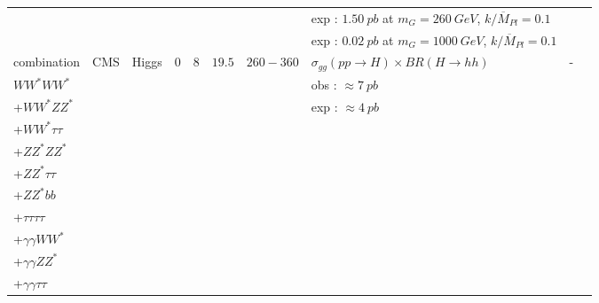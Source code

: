 \begin{table}[h!]
{\begin{tabular}{|l|l|c|c|c|c|c|l|c|c|}
                    &        &                &    &        &        &            &exp : $1.50\ pb$ at $m_G=260\ GeV$, $k/\overline{M}_{Pl}=0.1$                &    &\\
                    &        &                &    &        &        &            &exp : $0.02\ pb$ at $m_G=1000\ GeV$, $k/\overline{M}_{Pl}=0.1$                &    &\\
\cline{1-10}
combination                &CMS        &Higgs                &0    &$8$        &$19.5$        &$260-360$        &$\sigma_{gg}(pp\rightarrow H)\times BR(H\rightarrow hh)$                 &-    &\cite{Khachatryan:2014jya}\\
$WW^* WW^*$                &        &                &    &        &        &            &obs : $\approx 7\ pb$    & &\\
+$WW^*ZZ^*$                &        &                &    &        &        &            &exp : $\approx 4\ pb$    & &\\
+$WW^*\tau\tau$                &        &                &    &        &        &            &    & &\\
+$ZZ^* ZZ^*$                &        &                &    &        &        &            &    & &\\
+$ZZ^* \tau\tau$            &        &                &    &        &        &            &    & &\\
+$ZZ^* bb$                &        &                &    &        &        &            &    & &\\
+$\tau\tau \tau\tau$            &        &                &    &        &        &            &    & &\\
+$\gamma\gamma WW^*$            &        &                &    &        &        &            &    &     &\\
+$\gamma\gamma ZZ^*$            &        &                &    &        &        &            &    & &\\
+$\gamma\gamma \tau\tau$        &        &                &    &        &        &            &    & &\\
\hline

\end{tabular}}
\end{table}
